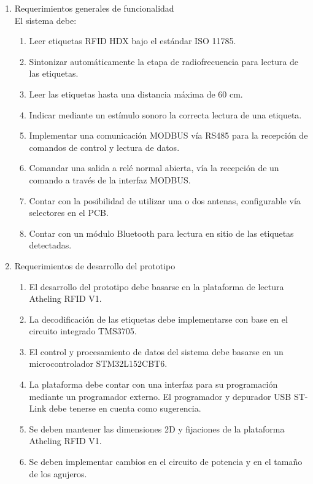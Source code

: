 \documentclass[
11pt, %
]{charter}
\begin{document}
\begin{enumerate}
	\item Requerimientos generales de funcionalidad\\
	El sistema debe:
		\begin{enumerate}
			\item  Leer etiquetas RFID HDX bajo el estándar ISO 11785.
			\item  Sintonizar automáticamente  la etapa de radiofrecuencia para lectura de las etiquetas.
			\item  Leer las etiquetas hasta una distancia máxima de 60 cm.
			\item  Indicar mediante un estímulo sonoro la correcta lectura de una etiqueta.
			\item  Implementar una comunicación MODBUS vía RS485 para la recepción de comandos de control y lectura de datos.
			\item  Comandar una salida a relé normal abierta, vía la recepción de un comando a través de la interfaz MODBUS.
			\item  Contar con la posibilidad de utilizar una o dos antenas, configurable vía selectores en el PCB.
			\item Contar con un módulo Bluetooth para lectura en sitio de las etiquetas detectadas. 

		\end{enumerate}
	\item Requerimientos de desarrollo del prototipo 
		\begin{enumerate}
			\item El desarrollo del prototipo debe basarse en la plataforma de lectura Atheling RFID V1.
			\item La decodificación de las etiquetas  debe implementarse con base en el circuito integrado TMS3705.
			\item El control y procesamiento de datos del sistema debe basarse en un microcontrolador STM32L152CBT6.
			\item La plataforma debe contar con una interfaz para su programación mediante un programador externo. El programador y depurador USB ST-Link debe tenerse en cuenta como sugerencia.
			\item Se deben mantener las dimensiones 2D y fijaciones de la plataforma Atheling RFID V1.
			\item Se deben implementar cambios en el circuito de potencia y en el tamaño de los agujeros.
			

\end{enumerate}
\end{enumerate}
\end{document}
